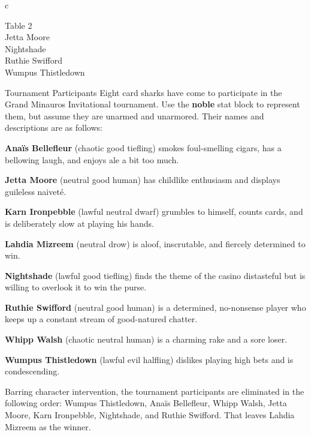 \documentclass[10pt,a4paper,twoside,bg=print,twocolumn,openany,nodeprecatedcode]{dndbook}
\begin{document}
\begin{DndTable}{c}

Table 2\\
Jetta Moore\\
Nightshade\\
Ruthie Swifford\\
Wumpus Thistledown\\
\end{DndTable}

\begin{DndSidebar}[float=!b]{Tournament Participants}
Eight card sharks have come to participate in the Grand Minauros Invitational tournament. Use the \textbf{noble} stat block to represent them, but assume they are unarmed and unarmored. Their names and descriptions are as follows:



\textbf{Anaïs Bellefleur} (chaotic good tiefling) smokes foul-smelling cigars, has a bellowing laugh, and enjoys ale a bit too much.



\textbf{Jetta Moore} (neutral good human) has childlike enthusiasm and displays guileless naiveté.



\textbf{Karn Ironpebble} (lawful neutral dwarf) grumbles to himself, counts cards, and is deliberately slow at playing his hands.



\textbf{Lahdia Mizreem} (neutral drow) is aloof, inscrutable, and fiercely determined to win.



\textbf{Nightshade} (lawful good tiefling) finds the theme of the casino distasteful but is willing to overlook it to win the purse.



\textbf{Ruthie Swifford} (neutral good human) is a determined, no-nonsense player who keeps up a constant stream of good-natured chatter.



\textbf{Whipp Walsh} (chaotic neutral human) is a charming rake and a sore loser.



\textbf{Wumpus Thistledown} (lawful evil halfling) dislikes playing high bets and is condescending.



Barring character intervention, the tournament participants are eliminated in the following order: Wumpus Thistledown, Anaïs Bellefleur, Whipp Walsh, Jetta Moore, Karn Ironpebble, Nightshade, and Ruthie Swifford. That leaves Lahdia Mizreem as the winner.



\end{DndSidebar}
\end{document}
